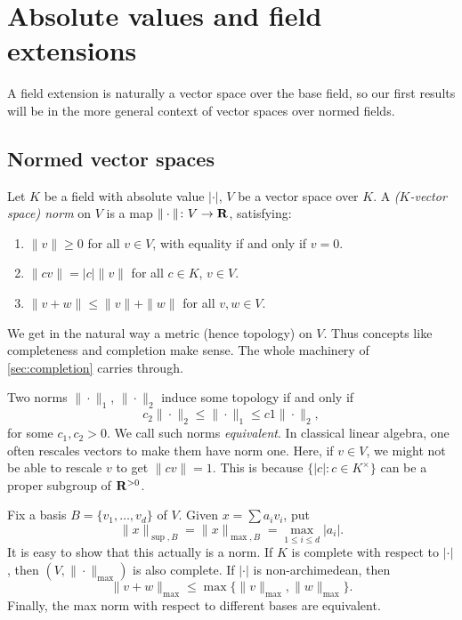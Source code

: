 \section{Absolute values and field extensions}\label{sec:abs-val-field-ext}

A field extension is naturally a vector space over the base field, so our 
first results will be in the more general context of vector spaces over 
normed fields. 



\subsection{Normed vector spaces}

\begin{definition}
Let $K$ be a field with absolute value $|\cdot|$, $V$ be a vector space over 
$K$. A \emph{($K$-vector space) norm} on $V$ is a map 
$\|\cdot\|\colon V\to \mathbf{R}$, satisfying: 
\begin{enumerate}
\item 
$\|v\|\geqslant 0$ for all $v\in V$, with equality if and only if $v=0$. 

\item
$\|c v\| = |c|\|v\|$ for all $c\in K$, $v\in V$. 

\item
$\|v+w\|\leqslant \|v\|+\|w\|$ for all $v,w\in V$. 
\end{enumerate}
\end{definition}

We get in the natural way a metric (hence topology) on $V$. Thus concepts like 
completeness and completion make sense. The whole machinery of 
\autoref{sec:completion} carries through. 

Two norms $\|\cdot\|_1$, $\|\cdot\|_2$ induce some topology if and only if 
\[
  c_2 \|\cdot\|_2 \leqslant \|\cdot\|_1 \leqslant c1 \|\cdot\|_2 ,
\]
for some $c_1,c_2>0$. We call such norms \emph{equivalent}. 
In classical linear algebra, one often rescales vectors 
to make them have norm one. Here, if $v\in V$, we might not be able to 
rescale $v$ to get $\|cv\|=1$. This is because $\{|c|\colon c\in K^\times\}$ 
can be a proper subgroup of $\mathbf{R}^{>0}$. 

\begin{example}
Fix a basis $B=\{v_1,\dots,v_d\}$ of $V$. Given $x=\sum a_i v_i$, put 
\[
  \|x\|_{\sup,B} = \|x\|_{\max,B} = \max_{1\leqslant i\leqslant d} |a_i| .
\]
It is easy to show that this actually is a norm. If $K$ is complete with 
respect to $|\cdot|$, then $(V,\|\cdot\|_{\max})$ is also complete. If 
$|\cdot|$ is non-archimedean, then 
\[
  \|v+w\|_{\max} \leqslant \max\{\|v\|_{\max},\|w\|_{\max}\} .
\]
Finally, the max norm with respect to different bases are equivalent. 
\end{example}

